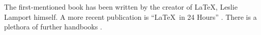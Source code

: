 The first-mentioned book \cite{lamport1994} has been written by the creator of \LaTeX{}, Leslie Lamport himself. A more recent publication is \enquote{\LaTeX\ in 24 Hours} \cite{datta2017}. There is a plethora of further handbooks \cite*[e.\,g.,][]{goossensmittelbach2002}.


